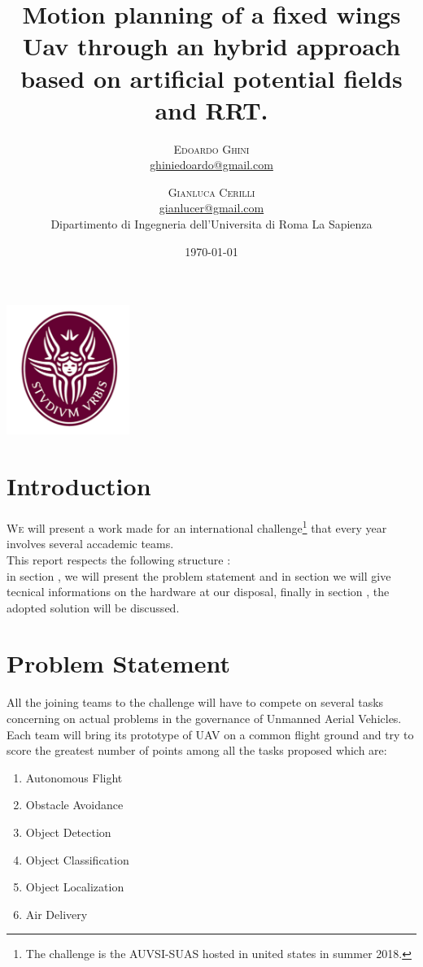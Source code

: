 \documentclass[oneside,onecolumn]{article}
\title{Motion planning of a fixed wings Uav through an hybrid approach based on artificial potential
  fields and RRT. } %
\author{%
  \textsc{Edoardo Ghini} \\[1ex] %
  \normalsize \href{mailto:ghiniedoardo@gmail.com}{ghiniedoardo@gmail.com} %
  \and %
  \textsc{Gianluca Cerilli} \\[1ex] %
  \normalsize \href{mailto:gianlucer@gmail.com}{gianlucer@gmail.com}\\ %
  \normalsize Dipartimento di Ingegneria dell'Universita di Roma La Sapienza\\
}
\date{\today} %
\begin{document}
\maketitle
\bigskip
\bigskip
\bigskip
\bigskip
\begin{center}
  \includegraphics[width=0.3\textwidth]{laSapienza}
\end{center}


\newpage
\section{Introduction}

\lettrine[nindent=0em,lines=3]{W}e will present a work made
for an international challenge\footnote{The challenge is the AUVSI-SUAS hosted
  in united states in summer 2018.} that every year involves several accademic teams.\\
This report respects the following structure : \\
in section , we will present the problem statement and in section
 we will give tecnical informations on the hardware at our disposal,
finally in section , the adopted solution will be discussed.


\section{Problem Statement}
All the joining teams to the challenge will have to compete on several tasks
concerning on actual problems in the governance of Unmanned Aerial Vehicles.\\
Each team will bring its prototype of UAV on a common flight ground and try to
score the greatest number of points among all the tasks proposed which are:
\begin{enumerate}\centering
\item Autonomous Flight
\item Obstacle Avoidance
\item Object Detection
\item Object Classification
\item Object Localization 
\item Air Delivery
\end{enumerate}
\end{document}

